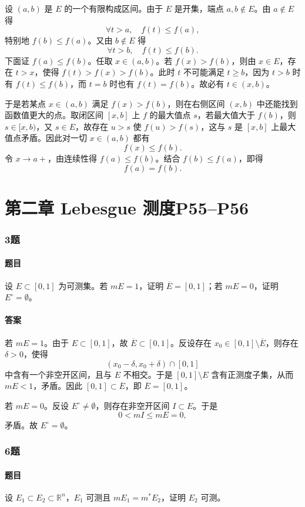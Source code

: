 \documentclass{article}
\begin{document}
设 $(a,b)$ 是 $E$ 的一个有限构成区间。由于 $E$ 是开集，端点 $a,b\notin E$。由 $a\notin E$ 得
\[
 \forall t>a,\quad f(t)\le f(a),
\]
特别地 $f(b)\le f(a)$。又由 $b\notin E$ 得
\[
 \forall t>b,\quad f(t)\le f(b).
\]
下面证 $f(a)\le f(b)$。任取 $x\in(a,b)$。若 $f(x)>f(b)$，则由 $x\in E$，存在 $t>x$，使得 $f(t)>f(x)>f(b)$。此时 $t$ 不可能满足 $t\ge b$，因为 $t>b$ 时有 $f(t)\le f(b)$，而 $t=b$ 时也有 $f(t)=f(b)$。故必有 $t\in(x,b)$。

于是若某点 $x\in(a,b)$ 满足 $f(x)>f(b)$，则在右侧区间 $(x,b)$ 中还能找到函数值更大的点。取闭区间 $[x,b]$ 上 $f$ 的最大值点 $s$，若最大值大于 $f(b)$，则 $s\in[x,b)$，又 $s\in E$，故存在 $u>s$ 使 $f(u)>f(s)$，这与 $s$ 是 $[x,b]$ 上最大值点矛盾。因此对一切 $x\in(a,b)$ 都有
\[
 f(x)\le f(b).
\]
令 $x\to a+$，由连续性得 $f(a)\le f(b)$。结合 $f(b)\le f(a)$，即得
\[
 f(a)=f(b).
\]

\section*{第二章 \quad Lebesgue 测度\quad P55--P56}

\subsubsection*{3题}
\paragraph{题目} 设 $E\subset[0,1]$ 为可测集。若 $mE=1$，证明 $\overline E=[0,1]$；若 $mE=0$，证明 $E^\circ=\emptyset$。

\paragraph{答案} 若 $mE=1$。由于 $E\subset[0,1]$，故 $\overline E\subset[0,1]$。反设存在 $x_0\in[0,1]\setminus\overline E$，则存在 $\delta>0$，使得
\[
 (x_0-\delta,x_0+\delta)\cap[0,1]
\]
中含有一个非空开区间，且与 $E$ 不相交。于是 $[0,1]\setminus E$ 含有正测度子集，从而 $mE<1$，矛盾。因此 $[0,1]\subset\overline E$，即 $\overline E=[0,1]$。

若 $mE=0$。反设 $E^\circ\neq\emptyset$，则存在非空开区间 $I\subset E$。于是
\[
 0<mI\le mE=0,
\]
矛盾。故 $E^\circ=\emptyset$。

\subsubsection*{6题}
\paragraph{题目} 设 $E_1\subset E_2\subset\mathbb{R}^n$，$E_1$ 可测且 $mE_1=m^*E_2$，证明 $E_2$ 可测。
\end{document}
